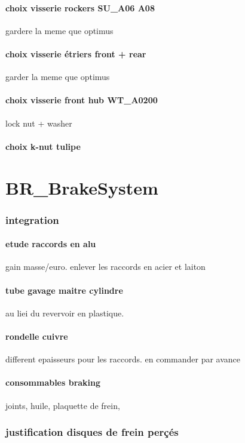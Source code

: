 			\paragraph{choix visserie rockers SU\_A06 A08} gardere la meme que optimus

			\paragraph{choix visserie étriers front + rear} garder la meme que optimus

			\paragraph{choix visserie front hub WT\_A0200} lock nut + washer 
			\paragraph{choix k-nut tulipe} 
\newpage 
 \section*{BR\_BrakeSystem} 
 \par 
		\subsubsection*{integration} 
 \par 
			\paragraph{etude raccords en alu} gain masse/euro. enlever les raccords en acier et laiton
			\paragraph{tube gavage maitre cylindre} au liei du revervoir en plastique.
			\paragraph{rondelle cuivre} different epaisseurs pour les raccords. en commander par avance 
			\paragraph{consommables braking} joints, huile, plaquette de frein, 
		\subsubsection*{justification disques de frein perçés} 
 \par 

